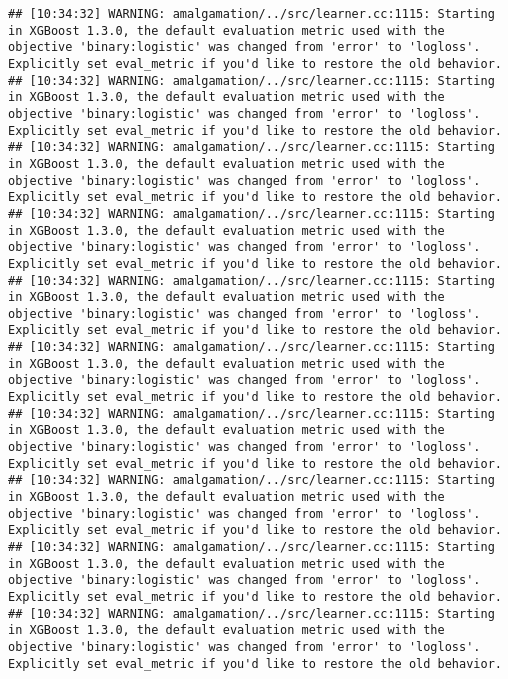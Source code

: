 \documentclass[
]{scrbook}
\begin{document}
\begin{verbatim}
## [10:34:32] WARNING: amalgamation/../src/learner.cc:1115: Starting in XGBoost 1.3.0, the default evaluation metric used with the objective 'binary:logistic' was changed from 'error' to 'logloss'. Explicitly set eval_metric if you'd like to restore the old behavior.
## [10:34:32] WARNING: amalgamation/../src/learner.cc:1115: Starting in XGBoost 1.3.0, the default evaluation metric used with the objective 'binary:logistic' was changed from 'error' to 'logloss'. Explicitly set eval_metric if you'd like to restore the old behavior.
## [10:34:32] WARNING: amalgamation/../src/learner.cc:1115: Starting in XGBoost 1.3.0, the default evaluation metric used with the objective 'binary:logistic' was changed from 'error' to 'logloss'. Explicitly set eval_metric if you'd like to restore the old behavior.
## [10:34:32] WARNING: amalgamation/../src/learner.cc:1115: Starting in XGBoost 1.3.0, the default evaluation metric used with the objective 'binary:logistic' was changed from 'error' to 'logloss'. Explicitly set eval_metric if you'd like to restore the old behavior.
## [10:34:32] WARNING: amalgamation/../src/learner.cc:1115: Starting in XGBoost 1.3.0, the default evaluation metric used with the objective 'binary:logistic' was changed from 'error' to 'logloss'. Explicitly set eval_metric if you'd like to restore the old behavior.
## [10:34:32] WARNING: amalgamation/../src/learner.cc:1115: Starting in XGBoost 1.3.0, the default evaluation metric used with the objective 'binary:logistic' was changed from 'error' to 'logloss'. Explicitly set eval_metric if you'd like to restore the old behavior.
## [10:34:32] WARNING: amalgamation/../src/learner.cc:1115: Starting in XGBoost 1.3.0, the default evaluation metric used with the objective 'binary:logistic' was changed from 'error' to 'logloss'. Explicitly set eval_metric if you'd like to restore the old behavior.
## [10:34:32] WARNING: amalgamation/../src/learner.cc:1115: Starting in XGBoost 1.3.0, the default evaluation metric used with the objective 'binary:logistic' was changed from 'error' to 'logloss'. Explicitly set eval_metric if you'd like to restore the old behavior.
## [10:34:32] WARNING: amalgamation/../src/learner.cc:1115: Starting in XGBoost 1.3.0, the default evaluation metric used with the objective 'binary:logistic' was changed from 'error' to 'logloss'. Explicitly set eval_metric if you'd like to restore the old behavior.
## [10:34:32] WARNING: amalgamation/../src/learner.cc:1115: Starting in XGBoost 1.3.0, the default evaluation metric used with the objective 'binary:logistic' was changed from 'error' to 'logloss'. Explicitly set eval_metric if you'd like to restore the old behavior.

\end{verbatim}
\end{document}

